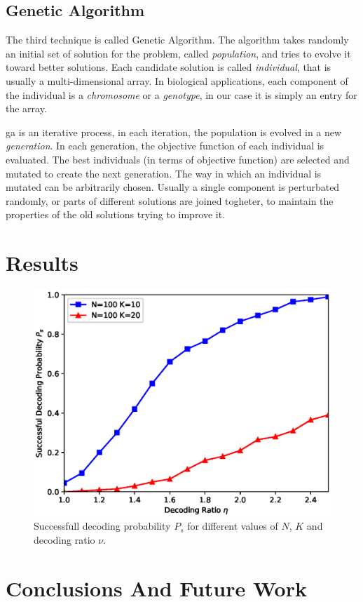 \documentclass[journal]{IEEEtran}
\begin{document}
\pagebreak

\begin{lstlisting}[frame=single]
\end{lstlisting} 


\subsection{Genetic Algorithm}
The third technique is called Genetic Algorithm.
The algorithm takes randomly an initial set of solution for the problem, called \textit{population}, and tries to evolve it toward better solutions.
Each candidate solution is called \textit{individual}, that is usually a multi-dimensional array. In biological applications, each component of the individual is a \textit{chromosome} or a \textit{genotype}, in our case it is simply an entry for the array.

\gls{ga} is an iterative process, in each iteration, the population is evolved in a new \textit{generation}.
In each generation, the objective function of each individual is evaluated. The best individuals (in terms of objective function) are selected and mutated to create the next generation.
The way in which an individual is mutated can be arbitrarily chosen.
Usually a single component is perturbated randomly, or parts of different solutions are joined togheter, to maintain the properties of the old solutions trying to improve it.

\section{Results}
\label{sec:results}
\begin{figure}
  \centering
	    \includegraphics[width=0.9\columnwidth]{ratiovsprob.eps}
  \caption{Successfull decoding probability $P_s$ for different values of $N$, $K$ and decoding ratio $\nu$.}
  \label{fig:ratiovsprob}
\end{figure}

\section{Conclusions And Future Work}
\label{sec:conclusions}



\end{document}
